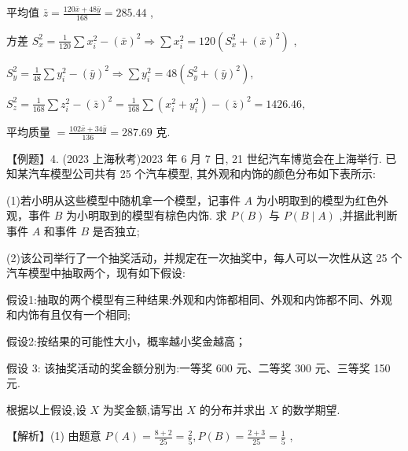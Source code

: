 \documentclass[10pt]{article}
\begin{document}
平均值 \(\bar{z} = \frac{{120}\bar{x} + {48}\bar{y}}{168} = {285.44}\) ,

方差 \({S}_{x}^{2} = \frac{1}{120}\sum {x}_{i}^{2} - {\left( \bar{x}\right) }^{2} \Rightarrow  \sum {x}_{i}^{2} = {120}\left( {{S}_{x}^{2} + {\left( \bar{x}\right) }^{2}}\right)\) ,

\({S}_{y}^{2} = \frac{1}{48}\sum {y}_{i}^{2} - {\left( \bar{y}\right) }^{2} \Rightarrow  \sum {y}_{i}^{2} = {48}\left( {{S}_{y}^{2} + {\left( \bar{y}\right) }^{2}}\right) ,\)

\({S}_{z}^{2} = \frac{1}{168}\sum {z}_{i}^{2} - {\left( \bar{z}\right) }^{2} = \frac{1}{168}\sum \left( {{x}_{i}^{2} + {y}_{i}^{2}}\right)  - {\left( \bar{z}\right) }^{2} = {1426.46},\)

平均质量 \(= \frac{{102}\bar{x} + {34}\bar{y}}{136} = {287.69}\) 克.

【例题】4. (2023 上海秋考)2023 年 6 月 7 日, 21 世纪汽车博览会在上海举行. 已知某汽车模型公司共有 25 个汽车模型, 其外观和内饰的颜色分布如下表所示:

\begin{center}
\end{center}

(1)若小明从这些模型中随机拿一个模型，记事件 \(A\) 为小明取到的模型为红色外观，事件 \(B\) 为小明取到的模型有棕色内饰. 求 \(P\left( B\right)\) 与 \(P\left( {B \mid  A}\right)\) ,并据此判断事件 \(A\) 和事件 \(B\) 是否独立;

(2)该公司举行了一个抽奖活动，并规定在一次抽奖中，每人可以一次性从这 25 个汽车模型中抽取两个，现有如下假设:

假设1:抽取的两个模型有三种结果:外观和内饰都相同、外观和内饰都不同、外观和内饰有且仅有一个相同;

假设2:按结果的可能性大小，概率越小奖金越高；

假设 3: 该抽奖活动的奖金额分别为:一等奖 600 元、二等奖 300 元、三等奖 150 元.

根据以上假设,设 \(X\) 为奖金额,请写出 \(X\) 的分布并求出 \(X\) 的数学期望.

【解析】(1) 由题意 \(P\left( A\right)  = \frac{8 + 2}{25} = \frac{2}{5},P\left( B\right)  = \frac{2 + 3}{25} = \frac{1}{5}\) ,
\end{document}

